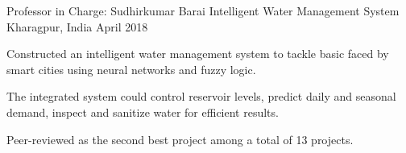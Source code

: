 \begin{cventries}
  \cventry
    {Professor in Charge: Sudhirkumar Barai} %
    {Intelligent Water Management System} %
    {Kharagpur, India} %
    {April 2018} %
    {
      \begin{cvitems} %
        \item {Constructed an intelligent water management system to tackle basic faced by smart cities using neural networks and fuzzy logic.}
        \item {The integrated system could control reservoir levels, predict daily and seasonal demand, inspect and sanitize water for efficient results.}
        \item {Peer-reviewed as the second best project among a total of 13 projects.}
      \end{cvitems}
    }

\end{cventries}
